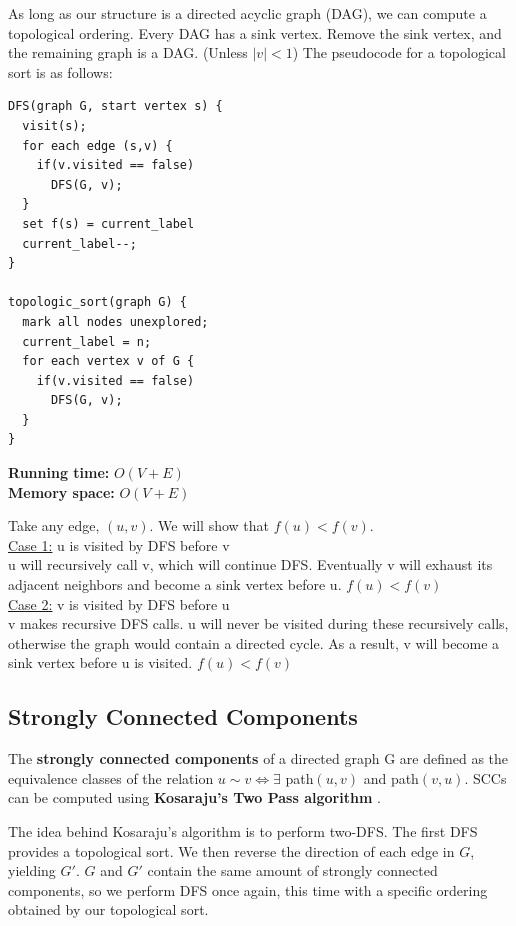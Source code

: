 \documentclass[]{book}
\makeatletter
\renewenvironment{proof}[1][\proofname] {\par\pushQED{\qed}\normalfont\topsep6\p@\@plus6\p@\relax\trivlist\item[\hskip\labelsep\bfseries#1\@addpunct{.}]\ignorespaces}{\popQED\endtrivlist\@endpefalse}
\newcommand{\runtime}[1]{\textbf{Running time:} $O(#1)$\\}
\newcommand{\memory}[1]{\textbf{Memory space:} $O(#1)$\\}
\makeatother
\begin{document}
      As long as our structure is a directed acyclic graph (DAG), we can compute a topological ordering.
      Every DAG has a sink vertex. Remove the sink vertex, and the remaining graph is a DAG. (Unless
      $|v| < 1$) The pseudocode for a topological sort is as follows:
      \begin{Verbatim}
DFS(graph G, start vertex s) {
  visit(s);
  for each edge (s,v) {
    if(v.visited == false)
      DFS(G, v);
  }
  set f(s) = current_label
  current_label--;
}

topologic_sort(graph G) {
  mark all nodes unexplored;
  current_label = n;
  for each vertex v of G {
    if(v.visited == false)
      DFS(G, v);
  }
}
      \end{Verbatim}
      \runtime{V + E}
      \memory{V + E}
      \begin{proof}
        Take any edge, $(u,v)$. We will show that $f(u) < f(v)$.\\

        \underline{Case 1:} u is visited by DFS before v\\
        u will recursively call v, which will continue DFS. Eventually v will exhaust
        its adjacent neighbors and become a sink vertex before u. $f(u) < f(v)$\\

        \underline{Case 2:} v is visited by DFS before u\\
        v makes recursive DFS calls. u will never be visited during these recursively calls,
        otherwise the graph would contain a directed cycle. As a result, v will become a sink
        vertex before u is visited. $f(u) < f(v)$
      \end{proof}

      \subsection*{Strongly Connected Components}
      The \textbf{strongly connected components} of a directed graph G are defined
      as the equivalence classes of the relation $u\sim v \Leftrightarrow \exists$ path$(u,v)$ and
      path$(v,u)$. SCCs can be computed using \textbf{Kosaraju's Two Pass algorithm}
      .

      The idea behind Kosaraju's algorithm is to perform two-DFS. The first DFS provides a topological
      sort. We then reverse the direction of each edge in $G$, yielding $G'$. $G$ and $G'$ contain
      the same amount of strongly connected components, so we perform DFS once again, this time
      with a specific ordering obtained by our topological sort.
\end{document}
